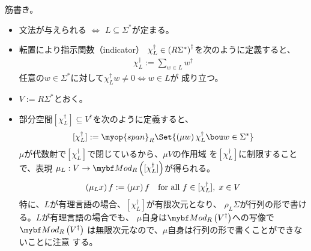 {	筋書き。
	\begin{itemize}\setlength{\itemsep}{-1mm} %
		\item 文法が与えられる $\iff$ $L\subseteq\Sigma^*$が定まる。
		\item 転置により指示関数（indicator）
		$\chi_L^\dag\in\left({R\Sigma^*}\right)^\dag$を次のように定義すると、
		\begin{equation*}\begin{split}
			\chi_L^\dag := \sum_{w\in L}w^\dag
		\end{split}\end{equation*}
		任意の$w\in\Sigma^*$に対して$\chi_L^\dag w\neq 0 \iff w\in L$が
		成り立つ。
		\item $V:=R\Sigma^*$とおく。
		\item 部分空間$[\chi_L^\dag]\subseteq V^\dag$を次のように定義すると、
		\begin{equation*}\begin{split}
			[\chi_L^\dag] 
			:= \myop{span}_R\Set{\lr{\mu w}\chi_L^\dag\bou w\in\Sigma^*}
		\end{split}\end{equation*}
		$\mu $が代数射で$[\chi_L^\dag]$で閉じているから、$\mu V$の作用域
		を$[\chi_L^\dag]$に制限することで、表現
		$\mu_L:V\to\cat{Mod}_R\lr{[\chi_L^\dag]}$が得られる。
		\begin{equation*}\begin{split}
			\left({\mu_Lx}\right)f := \left({\mu x}\right)f
			\quad\text{for all } f\in[\chi_L^\dag],\; x\in V
		\end{split}\end{equation*}
		特に、$L$が有理言語の場合、$[\chi_L^\dag]$が有限次元となり、
		$\rho_L\Sigma$が行列の形で書ける。$L$が有理言語の場合でも、
		$\mu$自身は$\cat{Mod}_R\lr{V^\dag}$への写像で$\cat{Mod}_R\lr{V^\dag}$
		は無限次元なので、$\mu$自身は行列の形で書くことができないことに注意
		する。
	\end{itemize} %

}

